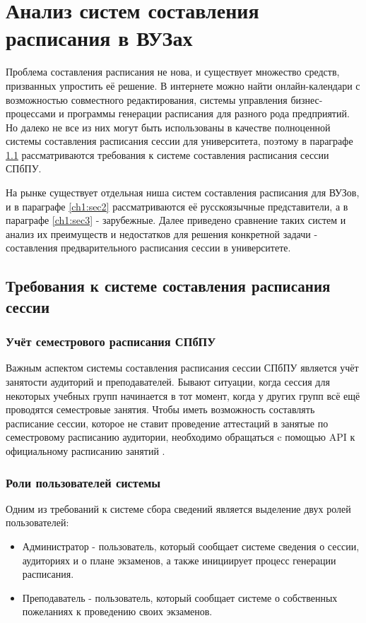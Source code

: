 \chapter{Анализ систем составления расписания в ВУЗах} \label{ch1}

Проблема составления расписания не нова, и существует множество средств, призванных упростить её решение. В интернете можно найти онлайн-календари с возможностью совместного редактирования, системы управления бизнес-процессами и программы генерации расписания для разного рода предприятий. Но далеко не все из них могут быть использованы в качестве полноценной системы составления расписания сессии для университета, поэтому в параграфе \ref{ch1:sec1} рассматриваются требования к системе составления расписания сессии СПбПУ.

На рынке существует отдельная ниша систем составления расписания для ВУЗов, и в параграфе \ref{ch1:sec2} рассматриваются её русскоязычные представители, а в параграфе \ref{ch1:sec3} - зарубежные. Далее приведено сравнение таких систем и анализ их преимуществ и недостатков для решения конкретной задачи - составления предварительного расписания сессии в университете.

\section{Требования к системе составления расписания сессии} \label{ch1:sec1}

\subsection{Учёт семестрового расписания СПбПУ}

Важным аспектом системы составления расписания сессии СПбПУ является учёт занятости аудиторий и преподавателей. Бывают ситуации, когда сессия для некоторых учебных групп начинается в тот момент, когда у других групп всё ещё проводятся семестровые занятия. Чтобы иметь возможность составлять расписание сессии, которое не ставит проведение аттестаций в занятые по семестровому расписанию аудитории, необходимо обращаться c помощью API к официальному расписанию занятий  \cite{ruz}. 

\subsection{Роли пользователей системы}
Одним из требований к системе сбора сведений является выделение двух ролей пользователей:
\begin{itemize}
	\item Администратор - пользователь, который сообщает системе сведения о сессии, аудиториях и о плане экзаменов, а также инициирует процесс генерации расписания.
	\item Преподаватель - пользователь, который сообщает системе о собственных пожеланиях к проведению своих экзаменов.
\end{itemize}

